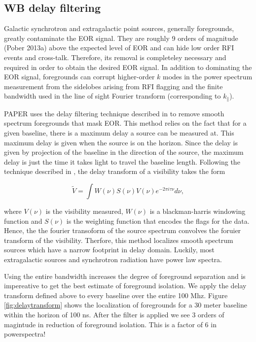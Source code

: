 \documentclass[twocolumn,numberedappendix]{emulateapj}
\begin{document}
\subsection{WB delay filtering}
Galactic synchrotron and extragalactic point sources, generally foregrounds,
greatly contaminate the EOR signal. They are roughly 9 orders of magnitude
(Pober 2013a) above the expected level of EOR and can hide low order RFI events
and cross-talk.  Therefore, its removal is completeley necessary and required in
order to obtain the desired EOR signal. In addition to dominating the EOR
signal, foregrounds can corrupt higher-order $k$ modes in the power spectrum
measurement from the sidelobes arising from RFI flagging and the finite
bandwidth used in the line of sight Fourier transform (corresponding to
$k_{\parallel}$). 

PAPER uses the delay filtering technique described in \citep{parsons_2012b} to
remove smooth spectrum foregrounds that mask EOR. This method relies on the fact
that for a given baseline, there is a maximum delay a source can be measured at.
This maximum delay is given when the source is on the horizon. Since the 
delay is given by projection of the baseline in the direction of the source, the
maximum delay is just the time it takes light to travel the baseline length. 
Following the technique described in \citep{parsons_2012b}, the delay transform
of a visibility takes the form 

\begin{equation}\label{eqn:delay_transform}
    \tilde{V} = \int{W(\nu)S(\nu)V(\nu)e^{-2\pi{i}\tau\nu}d\nu},
\end{equation}

where $V(\nu)$ is the visibility measured, $W(\nu)$ is a blackman-harris
windowing function and $S(\nu)$ is the weighting function that encodes the flags
for the data. Hence, the the fourier transoform of the source spectrum convolves
the foruier transform of the visibility. Therfore, this method localizes smooth
spectrum sources which have a narrow footprint in delay domain. Luckily, most
extragalactic sources and synchrotron radiation have power law spectra.

Using the entire bandwidth increases the degree of foreground separation and is
impereative to get the best estimate of foreground isolation. We apply the delay
transform defined above to every baseline over the entire 100 Mhz. Figure
\ref{fig:delaytransform} shows the localization of foregrounds for a 30 meter
baseline within the horizon of 100 ns. After the filter is applied we see 3
orders of magintude in reduction of foreground isolation.  This is a factor of 6
in powerspectra! 
\end{document}
